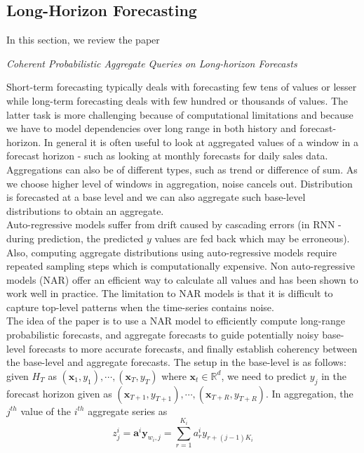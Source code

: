 \subsection{Long-Horizon Forecasting}
In this section, we review the paper
\begin{center}
	\textit{Coherent Probabilistic Aggregate Queries on Long-horizon Forecasts}
\end{center}
Short-term forecasting typically deals with forecasting few tens of values or lesser while long-term forecasting deals with few hundred or thousands of values. The latter task is more challenging because of computational limitations and because we have to model dependencies over long range in both history and forecast-horizon. In general it is often useful to look at aggregated values of a window in a forecast horizon - such as looking at monthly forecasts for daily sales data. Aggregations can also be of different types, such as trend or difference of sum. As we choose higher level of windows in aggregation, noise cancels out. Distribution is forecasted at a base level and we can also aggregate such base-level distributions to obtain an aggregate. \\
Auto-regressive models suffer from drift caused by cascading errors (in RNN - during prediction, the predicted $y$ values are fed back which may be erroneous). Also, computing aggregate distributions using auto-regressive models require repeated sampling steps which is computationally expensive. Non auto-regressive models (NAR) offer an efficient way to calculate all values and has been shown to work well in practice. The limitation to NAR models is that it is difficult to capture top-level patterns when the time-series contains noise. \\
The idea of the paper is to use a NAR model to efficiently compute long-range probabilistic forecasts, and aggregate forecasts to guide potentially noisy base-level forecasts to more accurate forecasts, and finally establish coherency between the base-level and aggregate forecasts. The setup in the base-level is as follows: given $H_T$ as $(\mathbf x_1, y_1), \cdots, (\mathbf x_T, y_T)$ where $\mathbf x_t \in \mathbb{R}^d$, we need to predict $y_j$ in the forecast horizon given as $(\mathbf x_{T+1}, y_{T+1}), \cdots, (\mathbf x_{T+R}, y_{T+R})$. In aggregation, the $j^{th}$ value of the $i^{th}$ aggregate series as
\begin{equation}
	z_j^i = \mathbf{a}^i \mathbf y_{w_i, j} = \sum_{r=1}^{K_i} a_r^i y_{r+(j-1)K_i}
\end{equation}
